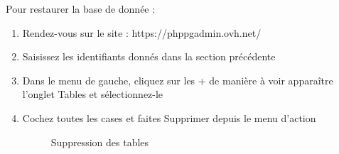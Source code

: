 \documentclass[11pt]{report}
\begin{document}
\par Pour restaurer la base de donnée : 
\begin{enumerate}
\item Rendez-vous sur le site : https://phppgadmin.ovh.net/
\item Saisissez les identifiants donnés dans la section précédente
\item Dans le menu de gauche, cliquez sur les \og + \fg{} de manière à voir
apparaître l'onglet \og Tables \fg{} et sélectionnez-le
\item Cochez toutes les cases et faites \og Supprimer \fg{} depuis le menu
d'action

    \begin{figure}[H] 
\caption{Suppression des tables}
\end{figure}


\end{enumerate}
\end{document}
